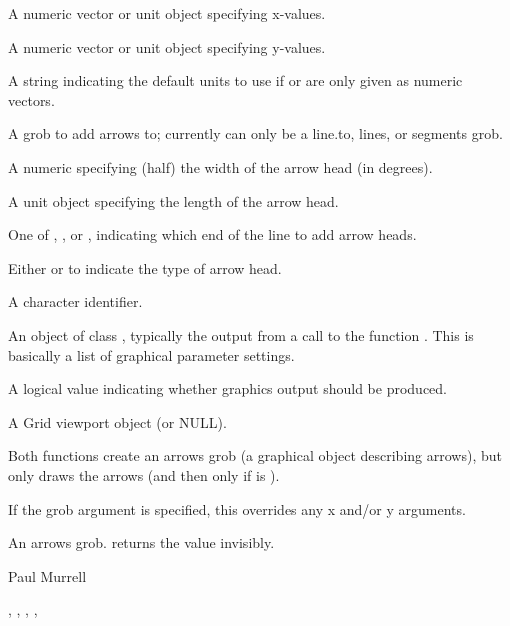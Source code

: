 \begin{Arguments}
\begin{ldescription}
\item[\code{x}] A numeric vector or unit object specifying x-values.
\item[\code{y}] A numeric vector or unit object specifying y-values.
\item[\code{default.units}] A string indicating the default units to use
if  or  are only given as numeric vectors. 
\item[\code{grob}]  A grob to add arrows to;  currently can only be
a line.to, lines, or segments grob. 
\item[\code{angle}]  A numeric specifying (half) the width of the arrow head
(in degrees). 
\item[\code{length}]  A unit object specifying the length of the arrow head. 
\item[\code{ends}]  One of , , or ,
indicating which end of the line to add arrow heads. 
\item[\code{type}]  Either  or  to indicate
the type of arrow head.   
\item[\code{name}]  A character identifier. 
\item[\code{gp}] An object of class , typically the output
from a call to the function .  This is basically
a list of graphical parameter settings.
\item[\code{draw}] A logical value indicating whether graphics output
should be produced.
\item[\code{vp}] A Grid viewport object (or NULL).
\end{ldescription}
\end{Arguments}
%
\begin{Details}\relax
Both functions create an arrows grob (a graphical object describing 
arrows), but only 
draws the arrows (and then only if  is ).

If the grob argument is specified, this overrides any x
and/or y arguments.
\end{Details}
%
\begin{Value}
An arrows grob.   returns the value invisibly.
\end{Value}
%
\begin{Author}\relax
 Paul Murrell 
\end{Author}
%
\begin{SeeAlso}\relax
{},
,
,
,
\end{SeeAlso}
